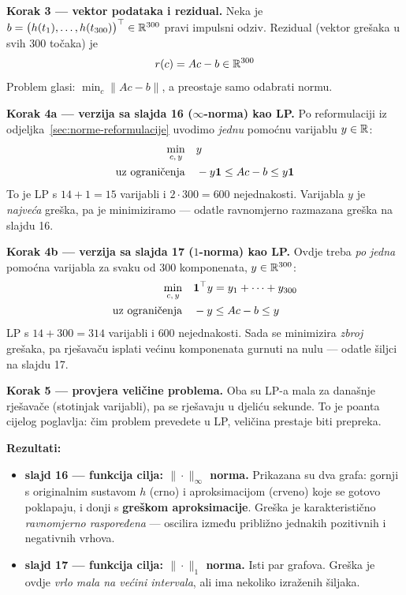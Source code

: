\textbf{Korak 3 --- vektor podataka i rezidual.} Neka je
$b = \big(h(t_1),\dots,h(t_{300})\big)\T \in \R^{300}$ pravi impulsni odziv.
Rezidual (vektor grešaka u svih 300 točaka) je
\[
r(c) = Ac - b \in \R^{300}
\]
Problem glasi: $\min_c \|Ac - b\|$, a preostaje samo odabrati normu.

\textbf{Korak 4a --- verzija sa slajda 16 ($\infty$-norma) kao LP.} Po
reformulaciji iz odjeljka~\ref{sec:norme-reformulacije} uvodimo \emph{jednu}
pomoćnu varijablu $y \in \R$:
\[
\begin{aligned}
\min_{c,\,y} \quad & y \\
\uzogr & -y\mathbf{1} \le Ac - b \le y\mathbf{1}
\end{aligned}
\]
To je LP s $14 + 1 = 15$ varijabli i $2\cdot300 = 600$ nejednakosti. Varijabla
$y$ je \emph{najveća} greška, pa je minimiziramo --- odatle ravnomjerno
razmazana greška na slajdu 16.

\textbf{Korak 4b --- verzija sa slajda 17 ($1$-norma) kao LP.} Ovdje treba
\emph{po jedna} pomoćna varijabla za svaku od 300 komponenata,
$y \in \R^{300}$:
\[
\begin{aligned}
\min_{c,\,y} \quad & \mathbf{1}\T y = y_1 + \dots + y_{300} \\
\uzogr & -y \le Ac - b \le y
\end{aligned}
\]
LP s $14 + 300 = 314$ varijabli i $600$ nejednakosti. Sada se minimizira
\emph{zbroj} grešaka, pa rješavaču isplati većinu komponenata gurnuti na nulu
--- odatle šiljci na slajdu 17.

\textbf{Korak 5 --- provjera veličine problema.} Oba su LP-a mala za današnje
rješavače (stotinjak varijabli), pa se rješavaju u djeliću sekunde. To je
poanta cijelog poglavlja: čim problem prevedete u LP, veličina prestaje biti
prepreka.

\textbf{Rezultati:}

\begin{itemize}
  \item \textbf{slajd 16 --- funkcija cilja: $\|\cdot\|_\infty$ norma.}
        Prikazana su dva grafa: gornji s originalnim sustavom $h$ (crno) i
        aproksimacijom (crveno) koje se gotovo poklapaju, i donji s
        \textbf{greškom aproksimacije}. Greška je karakteristično
        \emph{ravnomjerno raspoređena} --- oscilira između približno jednakih
        pozitivnih i negativnih vrhova.
  \item \textbf{slajd 17 --- funkcija cilja: $\|\cdot\|_1$ norma.} Isti par
        grafova. Greška je ovdje \emph{vrlo mala na većini intervala}, ali ima
        nekoliko izraženih šiljaka.
\end{itemize}

